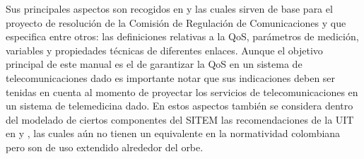 \begin{description}
Sus principales aspectos son recogidos en \cite{crtcondiciones} y \cite{crtindicadores}  las cuales sirven de base para el proyecto de resolución\cite{crtqos} de la Comisión de Regulación de Comunicaciones y que especifica entre otros: las definiciones relativas a la QoS, parámetros de medición, variables y propiedades técnicas de diferentes enlaces. Aunque el objetivo principal de este manual es el de garantizar la QoS en un sistema de telecomunicaciones dado es importante notar que sus indicaciones deben ser tenidas en cuenta al momento de proyectar los servicios de telecomunicaciones en un sistema de telemedicina dado. En estos aspectos también se considera dentro del modelado de ciertos componentes del SITEM las recomendaciones de la UIT en \cite{ITUG1000} y \cite{ITUG1010}, las cuales aún no tienen un equivalente en la normatividad colombiana pero son de uso extendido alrededor del orbe.

\end{description}